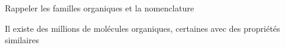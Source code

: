 \teteTermStssOrga

\vspace*{-34pt}

\begin{objectifs}
  \item Rappeler les familles organiques et la nomenclature
\end{objectifs}

\begin{contexte}
  Il existe des millions de molécules organiques, certaines avec des propriétés similaires

\end{contexte}


\vspace*{-8pt}

